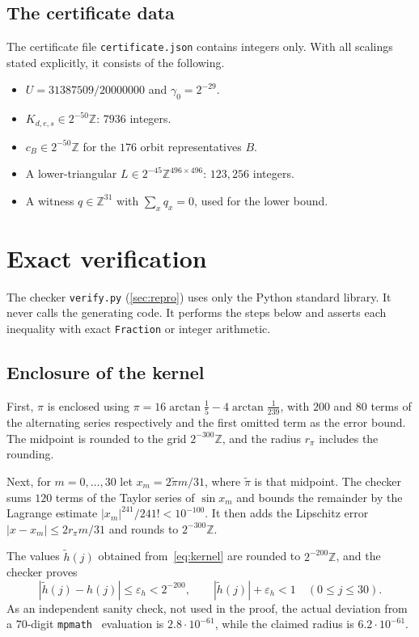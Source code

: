 \documentclass[11pt]{amsart}
\theoremstyle{definition}
\theoremstyle{remark}
\newcommand{\Z}{\mathbb{Z}}
\begin{document}
\subsection{The certificate data}
The certificate file \texttt{certificate.json} contains integers only. With all scalings stated explicitly, it consists of the following.
\begin{itemize}
  \item $U=31387509/20000000$ and $\gamma_0=2^{-29}$.
  \item $K_{d,e,s}\in2^{-50}\Z$: $7936$ integers.
  \item $c_B\in2^{-50}\Z$ for the $176$ orbit representatives $B$.
  \item A lower-triangular $L\in2^{-45}\Z^{496\times496}$: $123{,}256$ integers.
  \item A witness $q\in\Z^{31}$ with $\sum_x q_x=0$, used for the lower bound.
\end{itemize}

\section{Exact verification}\label{sec:verification}

The checker \texttt{verify.py} (\cref{sec:repro}) uses only the Python standard library. It never calls the generating code. It performs the steps below and asserts each inequality with exact \texttt{Fraction} or integer arithmetic.

\subsection{Enclosure of the kernel}\label{sec:trig}
First, $\pi$ is enclosed using $\pi=16\arctan\frac15-4\arctan\frac1{239}$, with $200$ and $80$ terms of the alternating series respectively and the first omitted term as the error bound. The midpoint is rounded to the grid $2^{-300}\Z$, and the radius $r_\pi$ includes the rounding.

Next, for $m=0,\dots,30$ let $x_m=2\tilde\pi m/31$, where $\tilde\pi$ is that midpoint. The checker sums $120$ terms of the Taylor series of $\sin x_m$ and bounds the remainder by the Lagrange estimate $|x_m|^{241}/241!<10^{-100}$. It then adds the Lipschitz error $|x-x_m|\le 2r_\pi m/31$ and rounds to $2^{-300}\Z$.

The values $\tilde h(j)$ obtained from~\eqref{eq:kernel} are rounded to $2^{-200}\Z$, and the checker proves
\[
  |\tilde h(j)-h(j)|\le\varepsilon_h<2^{-200},\qquad |\tilde h(j)|+\varepsilon_h<1\quad(0\le j\le30).
\]
As an independent sanity check, not used in the proof, the actual deviation from a $70$-digit \texttt{mpmath}~\cite{mpmath} evaluation is $2.8\cdot10^{-61}$, while the claimed radius is $6.2\cdot10^{-61}$.
\end{document}
